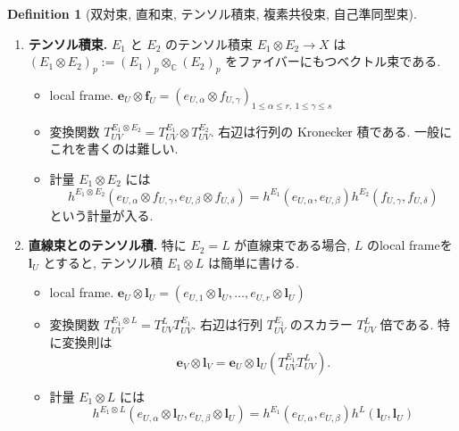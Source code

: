\documentclass[dvipdfmx,a4paper,11pt]{article} %
\theoremstyle{definition}
\newtheorem{defn}[thm]{Definition}
\theoremstyle{remark}
\numberwithin{equation}{section}
\begin{document}
\begin{defn}[双対束, 直和束, テンソル積束, 複素共役束, 自己準同型束]
\begin{enumerate}
\begin{itemize}
\[\begin{pmatrix}
0 & T^{E_2}_{UV}
\end{pmatrix}.
\]
直和束では, \(E_1\) 成分と \(E_2\) 成分がそれぞれ独立に変換する. つまり
\[
(\mathbf{e}_V,\mathbf{f}_V)=
(\mathbf{e}_U,\mathbf{f}_U)
\begin{pmatrix}
T^{E_1}_{UV} & 0\\
0 & T^{E_2}_{UV}
\end{pmatrix}.
\]
\item 計量 $E_1 \oplus E_2$には
\[
h^{E_1 \oplus E_2}
:= 
\begin{pmatrix}
h^{E_1} & 0\\
0 & h^{E_2}
\end{pmatrix}
\]
という計量が入る.
\end{itemize}

\item \textbf{テンソル積束.} \(E_1\) と \(E_2\) のテンソル積束 \(E_1\otimes E_2\to X\) は
\(
(E_1\otimes E_2)_p:=(E_1)_p\otimes_{\mathbb{C}}(E_2)_p
\)
をファイバーにもつベクトル束である.
\begin{itemize}
\item local frame. \(\mathbf{e}_U\otimes\mathbf{f}_U=(e_{U,\alpha}\otimes f_{U,\gamma})_{1\leq \alpha\leq r,\ 1\leq \gamma\leq s}\)
\item 変換関数 \(T^{E_1\otimes E_2}_{UV}=T^{E_1}_{UV}\otimes T^{E_2}_{UV}\). 右辺は行列の Kronecker 積である. 一般にこれを書くのは難しい.
\item 計量 \(E_1 \otimes E_2\) には
\[
h^{E_1 \otimes E_2}(e_{U,\alpha}\otimes f_{U,\gamma}, e_{U,\beta}\otimes f_{U,\delta})
= h^{E_1}(e_{U,\alpha},  e_{U,\beta})h^{E_2}( f_{U,\gamma},  f_{U,\delta})
\]
という計量が入る.
\end{itemize}
\item \textbf{直線束とのテンソル積.} 特に \(E_2=L\) が直線束である場合, \(L\) のlocal frameを \(\mathbf{l}_U\) とすると, テンソル積 \(E_1 \otimes L\) は簡単に書ける.
\begin{itemize}
\item local frame. \(\mathbf{e}_U\otimes\mathbf{l}_U
=(e_{U,1}\otimes \mathbf{l}_U,\ldots,e_{U,r}\otimes \mathbf{l}_U)\)
\item 変換関数 \(T^{E_1\otimes L}_{UV}=T^L_{UV}T^{E_1}_{UV}\). 右辺は行列 \(T^{E_1}_{UV}\) のスカラー \(T^L_{UV}\) 倍である. 特に変換則は
\[
\mathbf{e}_V\otimes\mathbf{l}_V
=
\mathbf{e}_U\otimes\mathbf{l}_U
(T^{E_1}_{UV}T^L_{UV}).
\]
\item 
計量 \(E_1 \otimes L\) には
\[
h^{E_1 \otimes L}(e_{U,\alpha}\otimes \mathbf{l}_U, e_{U,\beta}\otimes \mathbf{l}_U)
= h^{E_1}(e_{U,\alpha},  e_{U,\beta})h^{L}( \mathbf{l}_U,  \mathbf{l}_U)
\]
\end{itemize}
\end{enumerate}
\end{defn}
\end{document}
